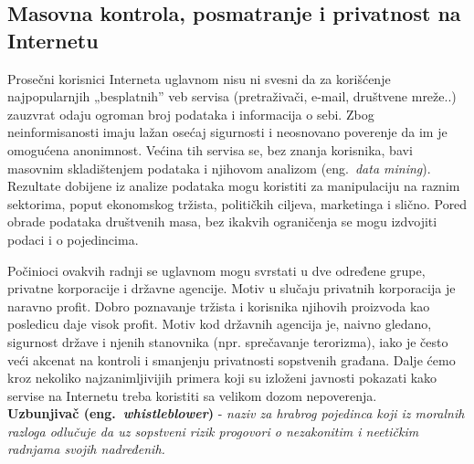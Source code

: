 \documentclass[a4paper]{article}
\begin{document}
\subsection{Masovna kontrola, posmatranje i privatnost na Internetu}
\label{subsec:podnaslovIP4}

\indent\indent Prosečni korisnici Interneta uglavnom nisu ni svesni da za korišćenje najpopularnjih „besplatnih” veb servisa (pretraživači, e-mail, društvene mreže..) zauzvrat odaju ogroman broj podataka i informacija o sebi. Zbog neinformisanosti imaju lažan osećaj sigurnosti i neosnovano poverenje da im je omogućena anonimnost. Većina tih servisa se, bez znanja korisnika, bavi masovnim skladištenjem podataka i njihovom analizom (eng.~{\em data mining}). Rezultate dobijene iz analize podataka mogu koristiti za manipulaciju na raznim sektorima, poput ekonomskog tržista, političkih ciljeva, marketinga i slično. Pored obrade podataka društvenih masa, bez ikakvih ograničenja se mogu izdvojiti podaci i o pojedincima.
		
	Počinioci ovakvih radnji se uglavnom mogu svrstati u dve određene grupe, privatne korporacije i državne agencije. Motiv u slučaju privatnih korporacija je naravno profit. Dobro poznavanje tržista i korisnika njihovih proizvoda kao posledicu daje visok profit. Motiv kod državnih agencija je, naivno gledano, sigurnost države i njenih stanovnika (npr. sprečavanje terorizma), iako je često veći akcenat na kontroli i smanjenju privatnosti sopstvenih građana. Dalje ćemo kroz nekoliko najzanimljivijih primera koji su izloženi javnosti pokazati kako servise na Internetu treba koristiti sa velikom dozom nepoverenja.\\
	
\textbf{Uzbunjivač (eng.~{\em whistleblower})} - \textit{naziv za hrabrog pojedinca koji iz moralnih razloga odlučuje da uz sopstveni rizik progovori o nezakonitim i neetičkim radnjama svojih nadređenih.}
\end{document}
